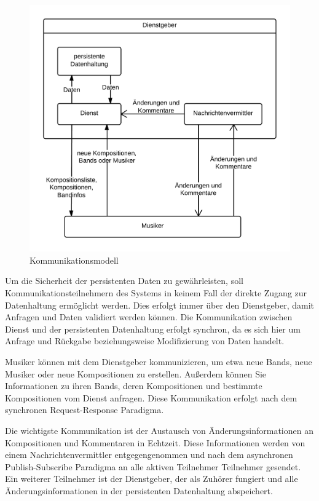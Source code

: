 \documentclass[12pt]{scrartcl}
\begin{document}
\begin{figure}
\centering
\includegraphics[scale=.25]{figures/kommunikationsmodell}
\caption{Kommunikationsmodell}
\label{fig:kommunikationsmodell}
\end{figure}

Um die Sicherheit der persistenten Daten zu gewährleisten, soll Kommunikationsteilnehmern des Systems in keinem Fall der direkte Zugang zur Datenhaltung ermöglicht werden. Dies erfolgt immer über den Dienstgeber, damit Anfragen und Daten validiert werden können. Die Kommunikation zwischen Dienst und der persistenten Datenhaltung erfolgt synchron, da es sich hier um Anfrage und Rückgabe beziehungsweise Modifizierung von Daten handelt.

Musiker können mit dem Dienstgeber kommunizieren, um etwa neue Bands, neue Musiker oder neue Kompositionen zu erstellen. Außerdem können Sie Informationen zu ihren Bands, deren Kompositionen und bestimmte Kompositionen vom Dienst anfragen. Diese Kommunikation erfolgt nach dem synchronen Request-Response Paradigma.

Die wichtigste Kommunikation ist der Austausch von Änderungsinformationen an Kompositionen und Kommentaren in Echtzeit. Diese Informationen werden von einem Nachrichtenvermittler entgegengenommen und nach dem asynchronen Publish-Subscribe Paradigma an alle aktiven Teilnehmer Teilnehmer gesendet. Ein weiterer Teilnehmer ist der Dienstgeber, der als Zuhörer fungiert und alle Änderungsinformationen in der persistenten Datenhaltung abspeichert.
\end{document}
